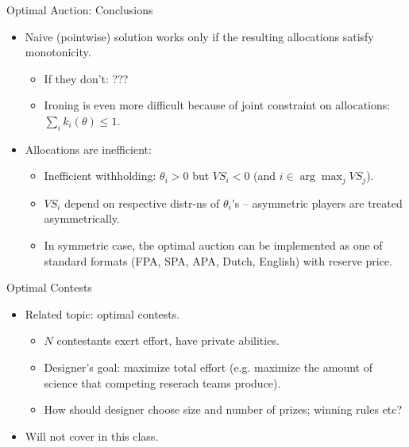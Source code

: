 \documentclass[english,10pt
,aspectratio=169
]{beamer}
\begin{document}
\begin{frame}{Optimal Auction: Conclusions}
\begin{itemize}
	\item Naive (pointwise) solution works only if the resulting allocations satisfy monotonicity.
	\begin{itemize}
		\item If they don't: ???
		\item Ironing is even more difficult because of joint constraint on allocations: $\sum_i k_i (\theta) \leq 1$.
	\end{itemize}
	\item Allocations are inefficient:
	\begin{itemize}
		\item Inefficient withholding: $\theta_i > 0$ but $VS_i < 0$ (and $i \in \arg \max_j VS_j$).
		\item $VS_i$ depend on respective distr-ns of $\theta_i$'s -- asymmetric players are treated asymmetrically.
		\item In symmetric case, the optimal auction can be implemented as one of standard formats (FPA, SPA, APA, Dutch, English) with reserve price.
	\end{itemize}
\end{itemize}
\end{frame}




\begin{frame}{Optimal Contests}
\begin{itemize}
	\item Related topic: optimal contests.
	\begin{itemize}
		\item $N$ contestants exert effort, have private abilities.
		\item Designer's goal: maximize total effort (e.g. maximize the amount of science that competing reserach teams produce).
		\item How should designer choose size and number of prizes; winning rules etc? 
	\end{itemize}
	\item Will not cover in this class.
\end{itemize}
\end{frame}
\end{document}
